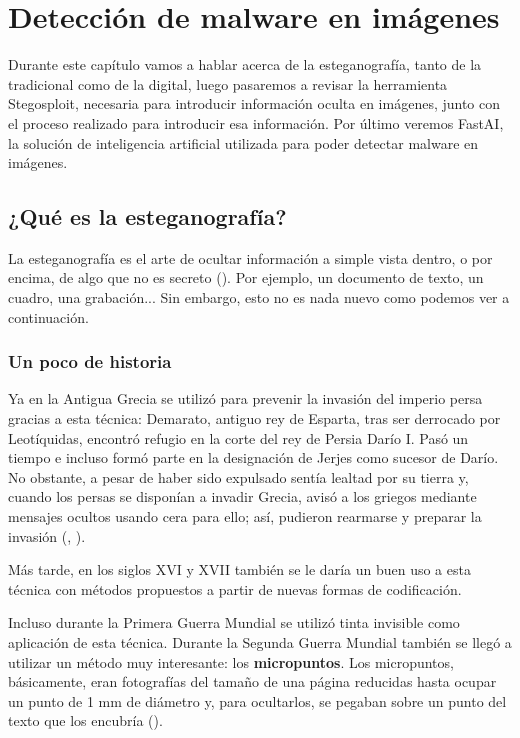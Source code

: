 \chapter{Detección de malware en imágenes}
\label{ch:det_mal}

Durante este capítulo vamos a hablar acerca de la esteganografía, tanto de la tradicional como de la digital, luego pasaremos a revisar la herramienta Stegosploit, necesaria para introducir información oculta en imágenes, junto con el proceso realizado para introducir esa información. Por último veremos FastAI, la solución de inteligencia artificial utilizada para poder detectar malware en imágenes.

\section{¿Qué es la esteganografía?}

La esteganografía es el arte de ocultar información a simple vista dentro, o por encima, de algo que no es secreto (\cite{esteganografia-digital}). Por ejemplo, un documento de texto, un cuadro, una grabación... Sin embargo, esto no es nada nuevo como podemos ver a continuación.%

\subsection{Un poco de historia}

Ya en la Antigua Grecia se utilizó para prevenir la invasión del imperio persa gracias a esta técnica: Demarato, antiguo rey de Esparta, tras ser derrocado por Leotíquidas, encontró refugio en la corte del rey de Persia Darío I. Pasó un tiempo e incluso formó parte en la designación de Jerjes como sucesor de Darío. No obstante, a pesar de haber sido expulsado sentía lealtad por su tierra y, cuando los persas se disponían a invadir Grecia, avisó a los griegos mediante mensajes ocultos usando cera para ello; así, pudieron rearmarse y preparar la invasión (\cite{demarato}, \cite{cera-micropuntos}). %

Más tarde, en los siglos XVI y XVII también se le daría un buen uso a esta técnica con métodos propuestos a partir de nuevas formas de codificación.

Incluso durante la Primera Guerra Mundial se utilizó tinta invisible como aplicación de esta técnica. Durante la Segunda Guerra Mundial también se llegó a utilizar un método muy interesante: los \textbf{micropuntos}. Los micropuntos, básicamente, eran fotografías del tamaño de una página reducidas hasta ocupar un punto de 1 mm de diámetro y, para ocultarlos, se pegaban sobre un punto del texto que los encubría (\cite{cera-micropuntos}). %

